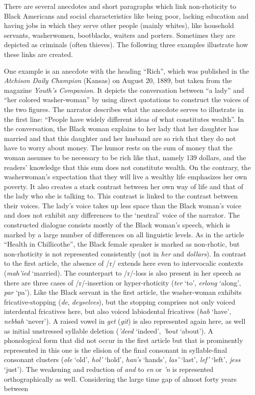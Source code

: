 There are several anecdotes and short paragraphs which link non-rhoticity to Black Americans and social characteristics like being poor, lacking education and having jobs in which they serve other people (mainly whites), like household servants, washerwomen, bootblacks, waiters and porters. Sometimes they are depicted as criminals (often thieves). The following three examples illustrate how these links are created.

One example is an anecdote with the heading “Rich”, which was published in the \emph{Atchison Daily Champion} (Kansas) on August 20, 1889, but taken from the magazine \emph{Youth’s Companion}. It depicts the conversation between “a lady” and “her colored washer-woman” by using direct quotations to construct the voices of the two figures. The narrator describes what the anecdote serves to illustrate in the first line: “People have widely different ideas of what constitutes wealth”. In the conversation, the Black woman explains to her lady that her daughter has married and that this daughter and her husband are so rich that they do not have to worry about money. The humor rests on the sum of money that the woman assumes to be necessary to be rich like that, namely 139 dollars, and the readers’ knowledge that this sum does not constitute wealth. On the contrary, the washerwoman’s expectation that they will live a wealthy life emphasizes her own poverty. It also creates a stark contrast between her own way of life and that of the lady who she is talking to. This contrast is linked to the contrast between their voices. The lady’s voice takes up less space than the Black woman’s voice and does not exhibit any differences to the ‘neutral’ voice of the narrator. The constructed dialogue consists mostly of the Black woman’s speech, which is marked by a large number of differences on all linguistic levels. As in the article “Health in Chillicothe”, the Black female speaker is marked as non-rhotic, but non-rhoticity is not represented consistently (not in \emph{her} and \emph{dollars}). In contrast to the first article, the absence of /r/ extends here even to intervocalic contexts (\emph{mah’ied} ‘married). The counterpart to /r/-loss is also present in her speech as there are three cases of /r/-insertion or hyper-rhoticity (\emph{ter} ‘to’, \emph{erlong} ‘along’, \emph{par} ‘pa’). Like the Black servant in the first article, the washer-woman exhibits fricative-stopping (\emph{de}, \emph{deyselves}), but the stopping comprises not only voiced interdental fricatives here, but also voiced labiodental fricatives (\emph{hab} ‘have’, \emph{nebbah} ‘never’). A raised vowel in \emph{get} (\emph{git}) is also represented again here, as well as initial unstressed syllable deletion (\emph{’deed} ‘indeed’, \emph{’bout} ‘about’). A phonological form that did not occur in the first article but that is prominently represented in this one is the elision of the final consonant in syllable-final consonant clusters (\emph{ole} ‘old’, \emph{hol’} ‘hold’, \emph{han’s} ‘hands’,  \emph{las’} ‘last’, \emph{lef’} ‘left’, \emph{jess} ‘just’). The weakening and reduction of \emph{and} to \emph{en} or \emph{’n} is represented orthographically as well. Considering the large time gap of almost forty years between 